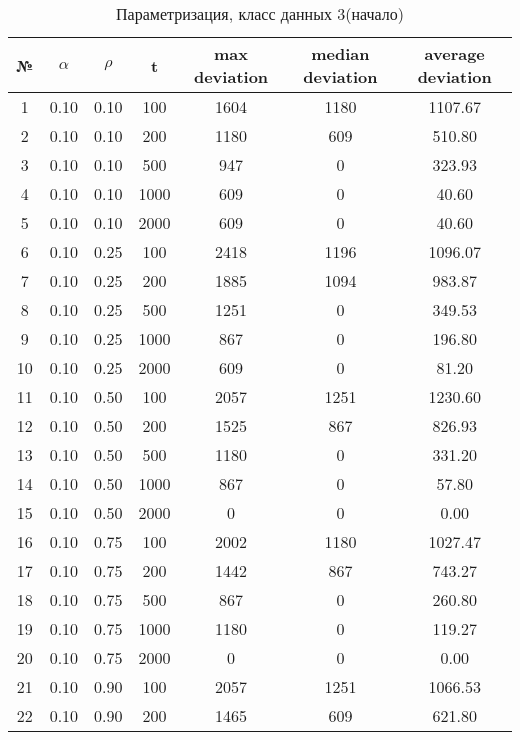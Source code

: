 \documentclass[a4paper, 12pt, unknownkeysallowed]{extreport}
\begin{document}
\begin{center}
  \captionsetup{justification=raggedright,singlelinecheck=off}
  \begin{longtable}[c]{|c|c|c|c|c|c|c|}
  \caption{Параметризация, класс данных 3(начало)\label{tbl:p_3_1}} \\ \hline
  № & $\alpha$ & $\rho$ & t & max deviation & median deviation & average deviation \\ \hline   
  1 & 0.10 & 0.10 &   100 & 1604 & 1180 & 1107.67 \\ \hline
  2 & 0.10 & 0.10 &   200 & 1180 &  609 & 510.80 \\ \hline
  3 & 0.10 & 0.10 &   500 &  947 &    0 & 323.93 \\ \hline
  4 & 0.10 & 0.10 &  1000 &  609 &    0 & 40.60 \\ \hline
  5 & 0.10 & 0.10 &  2000 &  609 &    0 & 40.60 \\ \hline
  6 & 0.10 & 0.25 &   100 & 2418 & 1196 & 1096.07 \\ \hline
  7 & 0.10 & 0.25 &   200 & 1885 & 1094 & 983.87 \\ \hline
  8 & 0.10 & 0.25 &   500 & 1251 &    0 & 349.53 \\ \hline
  9 & 0.10 & 0.25 &  1000 &  867 &    0 & 196.80 \\ \hline
 10 & 0.10 & 0.25 &  2000 &  609 &    0 & 81.20 \\ \hline
 11 & 0.10 & 0.50 &   100 & 2057 & 1251 & 1230.60 \\ \hline
 12 & 0.10 & 0.50 &   200 & 1525 &  867 & 826.93 \\ \hline
 13 & 0.10 & 0.50 &   500 & 1180 &    0 & 331.20 \\ \hline
 14 & 0.10 & 0.50 &  1000 &  867 &    0 & 57.80 \\ \hline
 15 & 0.10 & 0.50 &  2000 &    0 &    0 &  0.00 \\ \hline
 16 & 0.10 & 0.75 &   100 & 2002 & 1180 & 1027.47 \\ \hline
 17 & 0.10 & 0.75 &   200 & 1442 &  867 & 743.27 \\ \hline
 18 & 0.10 & 0.75 &   500 &  867 &    0 & 260.80 \\ \hline
 19 & 0.10 & 0.75 &  1000 & 1180 &    0 & 119.27 \\ \hline
 20 & 0.10 & 0.75 &  2000 &    0 &    0 &  0.00 \\ \hline
 21 & 0.10 & 0.90 &   100 & 2057 & 1251 & 1066.53 \\ \hline
 22 & 0.10 & 0.90 &   200 & 1465 &  609 & 621.80 \\ \hline

\end{longtable}
\end{center}
\end{document}
